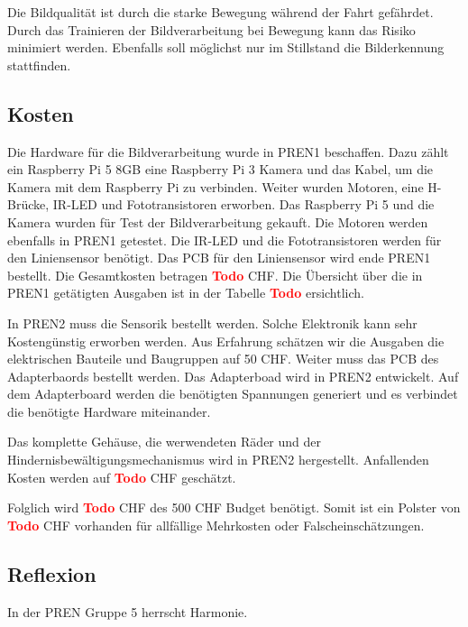 \documentclass[../main.tex]{subfiles}
\begin{document}
Die Bildqualität ist durch die starke Bewegung während der Fahrt gefährdet. Durch das Trainieren der Bildverarbeitung bei Bewegung kann das Risiko minimiert werden. Ebenfalls soll möglichst nur im Stillstand die Bilderkennung stattfinden. 

\subsection{Kosten}
Die Hardware für die Bildverarbeitung wurde in PREN1 beschaffen. Dazu zählt ein Raspberry Pi 5 8GB eine Raspberry Pi 3 Kamera und das Kabel, um die Kamera mit dem Raspberry Pi zu verbinden. Weiter wurden Motoren, eine H-Brücke, IR-LED und Fototransistoren erworben. Das Raspberry Pi 5 und die Kamera wurden für Test der Bildverarbeitung gekauft. Die Motoren werden ebenfalls in PREN1 getestet. Die IR-LED und die Fototransistoren werden für den Liniensensor benötigt. Das PCB für den Liniensensor wird ende PREN1 bestellt. Die Gesamtkosten betragen  \textcolor{red}{\textbf{Todo}} CHF. Die Übersicht über die in PREN1 getätigten Ausgaben ist in der Tabelle \textcolor{red}{\textbf{Todo}} ersichtlich. 

In PREN2 muss die Sensorik bestellt werden. Solche Elektronik kann sehr Kostengünstig erworben werden. Aus Erfahrung schätzen wir die Ausgaben die elektrischen Bauteile und Baugruppen auf 50 CHF. Weiter muss das PCB des Adapterbaords bestellt werden. Das Adapterboad wird in PREN2 entwickelt. Auf dem Adapterboard werden die benötigten Spannungen generiert und es verbindet die benötigte Hardware miteinander. 

Das komplette Gehäuse, die werwendeten Räder und der Hindernisbewältigungsmechanismus wird in PREN2 hergestellt. Anfallenden Kosten werden auf \textcolor{red}{\textbf{Todo}} CHF geschätzt.

Folglich wird \textcolor{red}{\textbf{Todo}} CHF des 500 CHF Budget benötigt. Somit ist ein Polster von \textcolor{red}{\textbf{Todo}} CHF vorhanden für allfällige Mehrkosten oder Falscheinschätzungen.

\subsection{Reflexion}

In der PREN Gruppe 5 herrscht Harmonie.
\end{document}
